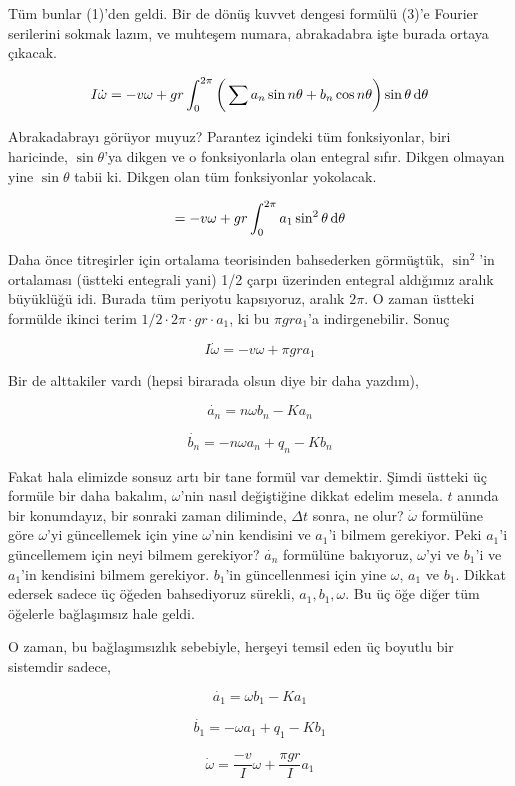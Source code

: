\documentclass[12pt,fleqn]{article}\usepackage{../../common}
\begin{document}
Tüm bunlar (1)'den geldi. Bir de dönüş kuvvet dengesi formülü (3)'e Fourier
serilerini sokmak lazım, ve muhteşem numara, abrakadabra işte burada ortaya
çıkacak. 

$$ 
I \dot{\omega} = - v \omega + gr \int_{0}^{2\pi} 
\bigg(\sum a_n \sin n\theta + b_n \cos n\theta \bigg) \sin\theta \,\mathrm{d} \theta
$$

Abrakadabrayı görüyor muyuz? Parantez içindeki tüm fonksiyonlar, biri
haricinde, $\sin\theta$'ya dikgen ve o fonksiyonlarla olan entegral
sıfır. Dikgen olmayan yine $\sin\theta$ tabii ki. Dikgen olan tüm
fonksiyonlar yokolacak.

$$   = - v \omega + gr \int_{0}^{2\pi} a_1 \sin^2 \theta\,\mathrm{d}\theta $$

Daha önce titreşirler için ortalama teorisinden bahsederken görmüştük,
$\sin^2$'in ortalaması (üstteki entegrali yani) 1/2 çarpı üzerinden
entegral aldığımız aralık büyüklüğü idi. Burada tüm periyotu kapsıyoruz,
aralık $2\pi$. O zaman üstteki formülde ikinci terim
$1/2 \cdot 2\pi \cdot gr \cdot a_1 $, ki bu $\pi gr a_1$'a
indirgenebilir. Sonuç

$$ I \dot{\omega} = -v \omega + \pi gr a_1 $$

Bir de alttakiler vardı (hepsi birarada olsun diye bir daha yazdım),

$$ 
\dot{a_n} = n \omega b_n - K a_n 
$$

$$ 
\dot{b_n} = -n \omega a_n + q_n - K b_n 
$$

Fakat hala elimizde sonsuz artı bir tane formül var demektir. Şimdi üstteki
üç formüle bir daha bakalım, $\omega$'nin nasıl değiştiğine dikkat edelim
mesela. $t$ anında bir konumdayız, bir sonraki zaman diliminde, $\Delta t$
sonra, ne olur? $\dot{\omega}$ formülüne göre $\omega$'yi güncellemek için
yine $\omega$'nin kendisini ve $a_1$'i bilmem gerekiyor. Peki $a_1$'i
güncellemem için neyi bilmem gerekiyor? $\dot{a_n}$ formülüne bakıyoruz,
$\omega$'yi ve $b_1$'i ve $a_1$'in kendisini bilmem gerekiyor. $b_1$'in
güncellenmesi için yine $\omega$, $a_1$ ve $b_1$. Dikkat edersek sadece üç
öğeden bahsediyoruz sürekli, $a_1,b_1,\omega$. Bu üç öğe diğer tüm öğelerle
bağlaşımsız hale geldi. 

O zaman, bu bağlaşımsızlık sebebiyle, herşeyi temsil eden üç boyutlu bir
sistemdir sadece, 

$$ \dot{a_1} = \omega b_1 - K a_1 $$

$$ \dot{b_1} = -\omega a_1 + q_1 - Kb_1 $$

$$ \dot{\omega} = \frac{-v}{I}\omega + \frac{\pi gr}{I} a_1 $$
\end{document}
